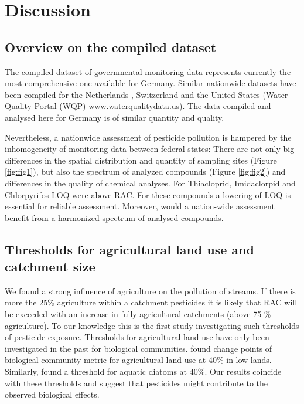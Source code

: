 \documentclass[journal=esthag,manuscript=article]{achemso}
\begin{document}
\section{Discussion}
\subsection{Overview on the compiled dataset}
The compiled dataset of governmental monitoring data represents currently the most comprehensive one available for Germany.
Similar nationwide datasets have been compiled for the Netherlands \citep{vijver_spatial_2008}, Switzerland \citep{munz_pestizidmessungen_2011} and the United States (Water Quality Portal (WQP) \url{www.waterqualitydata.us}).
The data compiled and analysed here for Germany is of similar quantity and quality.

Nevertheless, a nationwide assessment of pesticide pollution is hampered by the inhomogeneity of monitoring data between federal states:
There are not only big differences in the spatial distribution and quantity of sampling sites (Figure \ref{fig:fig1}), but also the spectrum of analyzed compounds (Figure \ref{fig:fig2}) and differences in the quality of chemical analyses. 
For Thiacloprid, Imidaclorpid and Chlorpyrifos LOQ were above RAC.
For these compounds a lowering of LOQ is essential for reliable assessment.
Moreover, would a nation-wide assessment benefit from a harmonized spectrum of analysed compounds.



\subsection{Thresholds for agricultural land use and catchment size}
We found a strong influence of agriculture on the pollution of streams.
If there is more the 25\% agriculture within a catchment pesticides it is likely that RAC will be exceeded with an increase in fully agricultural catchments (above 75 \% agriculture).
To our knowledge this is the first study investigating such thresholds of pesticide exposure.
Thresholds for agricultural land use have only been investigated in the past for biological communities.
\citet{feld_response_2013} found change points of biological community metric for agricultural land use at 40\% in low lands. 
Similarly, \citet{waite_agricultural_2014} found a threshold for aquatic diatoms at 40\%.
Our results coincide with these thresholds and suggest that pesticides might contribute to the observed biological effects. 
\end{document}
